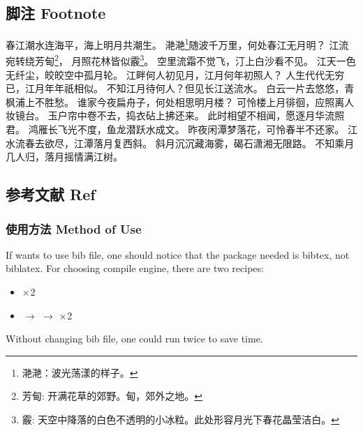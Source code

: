 \documentclass[a4paper]{article}
\begin{document}
    \subsection{脚注 Footnote}
    \begin{center}
        春江潮水连海平，海上明月共潮生。\newline
        滟滟\footnote{滟滟：波光荡漾的样子。}随波千万里，何处春江无月明？\newline
        江流宛转绕芳甸\footnote{芳甸: 开满花草的郊野。甸，郊外之地。}，
        月照花林皆似霰\footnote{霰: 天空中降落的白色不透明的小冰粒。此处形容月光下春花晶莹洁白。}。\newline
        空里流霜不觉飞，汀上白沙看不见。\newline
        江天一色无纤尘，皎皎空中孤月轮。\newline
        江畔何人初见月，江月何年初照人？\newline
        人生代代无穷已，江月年年祇相似。\newline
        不知江月待何人？但见长江送流水。\newline
        白云一片去悠悠，青枫浦上不胜愁。\newline
        谁家今夜扁舟子，何处相思明月楼？\newline
        可怜楼上月徘徊，应照离人妆镜台。\newline
        玉户帘中卷不去，捣衣砧上拂还来。\newline
        此时相望不相闻，愿逐月华流照君。\newline
        鸿雁长飞光不度，鱼龙潜跃水成文。\newline
        昨夜闲潭梦落花，可怜春半不还家。\newline
        江水流春去欲尽，江潭落月复西斜。\newline
        斜月沉沉藏海雾，碣石潇湘无限路。\newline
        不知乘月几人归，落月摇情满江树。\newline
    \end{center}

    \newpage
    \subsection{参考文献 Ref}
    \subsubsection{使用方法 Method of Use}
        If wants to use bib file, one should notice that the package needed is bibtex, not biblatex.
        For choosing compile engine, there are two recipes:
        \begin{itemize}
            \item \XeLaTeX × 2
            \item \XeLaTeX $\rightarrow$ \BibTeX $\rightarrow$ \XeLaTeX × 2
        \end{itemize}
        Without changing bib file, one could run \XeLaTeX twice to save time.
\end{document}
